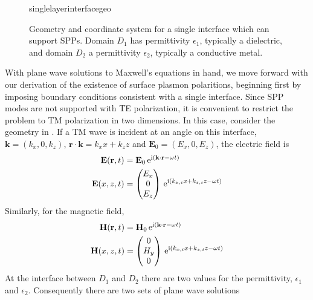 \begin{figure}[ht]
 \centering
 {singlelayerinterfacegeo}
	\caption{Geometry and coordinate system for a single interface which can
support SPPs.  Domain $D_1$ has permittivity $\epsilon_1$, typically a
dielectric, and domain $D_2$ a permittivity $\epsilon_2$, typically a
conductive metal.}
 \label{fig:singleinterfacegeo}
\end{figure}

With plane wave solutions to Maxwell's equations in hand, we move forward
with our derivation of the existence of surface plasmon polaritions,
beginning first by imposing boundary conditions consistent with a single
interface.  Since SPP modes are not supported with TE polarization, it is
convenient to restrict the problem to TM polarization in two dimensions.
In this case, consider the geometry in .  If
a TM wave is incident at an angle on this interface,
$\mathbf{k}=(k_x,0,k_z)$,
$\mathbf{r}\cdot\mathbf{k}=k_x x + k_z z$ and $\mathbf{E}_0 = (E_x, 0,
E_z)$, the electric field is
\begin{align}
\mathbf{E} ( \mathbf{r}, t ) &= \mathbf{E}_0\, {\mathrm{e}}^{{\mathrm{i}} (\mathbf{k}
\cdot \mathbf{r} - \omega t )}\\
\mathbf{E}(x,z,t)&=\begin{pmatrix}
E_x\\ 0\\ E_z
\end{pmatrix}
\, {\mathrm{e}}^{{\mathrm{i}}(k_{x,i}x+k_{z,i}z-\omega t)}
\label{eqn:planewavexz}
\end{align}
Similarly, for the magnetic field,
\begin{align}
\mathbf{H} ( \mathbf{r}, t ) &= \mathbf{H}_0\, {\mathrm{e}}^{{\mathrm{i}} (\mathbf{k}
\cdot \mathbf{r} - \omega t )}\\
\mathbf{H}(x,z,t)&=\begin{pmatrix}
0\\ H_y\\ 0
\end{pmatrix}
\, {\mathrm{e}}^{{\mathrm{i}}(k_{x,i}x+k_{z,i}z-\omega t)}
\end{align}
At the interface between $D_1$ and $D_2$ there are two values for the permittivity,
$\epsilon_1$ and $\epsilon_2$.  Consequently
there are two sets of plane wave solutions
